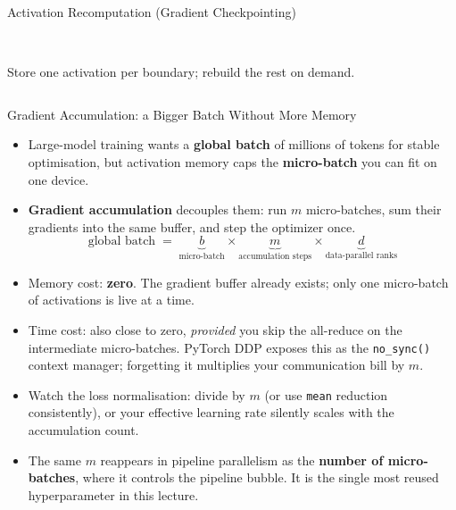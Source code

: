 \begin{frame}{Activation Recomputation (Gradient Checkpointing)}
\begin{columns}[T,onlytextwidth]
\\[0.5em]
      {\scriptsize Store one activation per boundary; rebuild the rest on demand.}
  \end{columns}
\end{frame}

\begin{frame}{Gradient Accumulation: a Bigger Batch Without More Memory}
  \begin{itemize}\footnotesize\itemsep0.4em
    \item[\textcolor{red}{$\blacktriangleright$}] Large-model training wants a \textbf{global batch} of millions of tokens for stable optimisation, but activation memory caps the \textbf{micro-batch} you can fit on one device.
    \item[\textcolor{red}{$\blacktriangleright$}] \textbf{Gradient accumulation} decouples them: run $m$ micro-batches, sum their gradients into the same buffer, and step the optimizer once.
      \[
        \text{global batch} \;=\; \underbrace{b}_{\text{micro-batch}} \times \underbrace{m}_{\text{accumulation steps}} \times \underbrace{d}_{\text{data-parallel ranks}}
      \]
    \item[\textcolor{red}{$\blacktriangleright$}] Memory cost: \textbf{zero}. The gradient buffer already exists; only one micro-batch of activations is live at a time.
    \item[\textcolor{red}{$\blacktriangleright$}] Time cost: also close to zero, \emph{provided} you skip the all-reduce on the intermediate micro-batches. PyTorch DDP exposes this as the \texttt{no\_sync()} context manager; forgetting it multiplies your communication bill by $m$.
    \item[\textcolor{red}{$\blacktriangleright$}] Watch the loss normalisation: divide by $m$ (or use \texttt{mean} reduction consistently), or your effective learning rate silently scales with the accumulation count.
    \item[\textcolor{red}{$\blacktriangleright$}] The same $m$ reappears in pipeline parallelism as the \textbf{number of micro-batches}, where it controls the pipeline bubble. It is the single most reused hyperparameter in this lecture.
  \end{itemize}
\end{frame}
